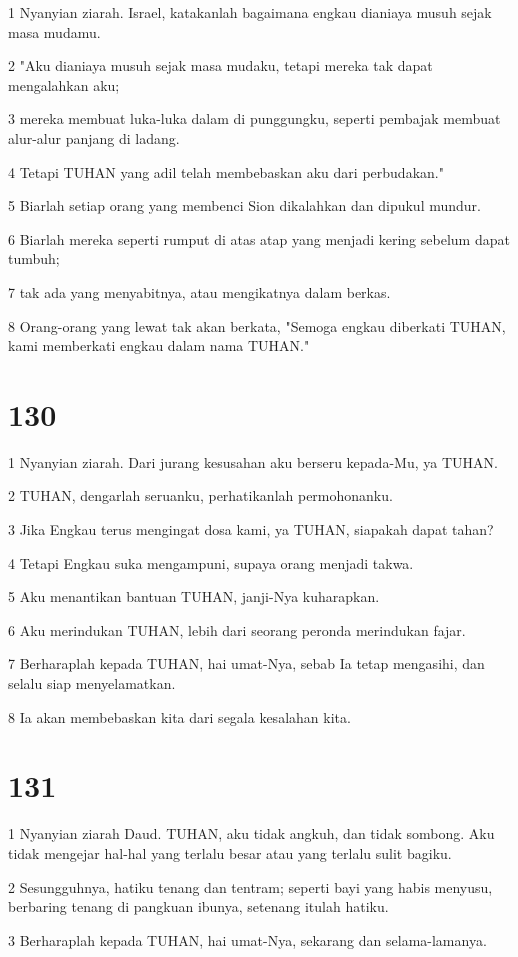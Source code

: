 \par 1 Nyanyian ziarah. Israel, katakanlah bagaimana engkau dianiaya musuh sejak masa mudamu.
\par 2 "Aku dianiaya musuh sejak masa mudaku, tetapi mereka tak dapat mengalahkan aku;
\par 3 mereka membuat luka-luka dalam di punggungku, seperti pembajak membuat alur-alur panjang di ladang.
\par 4 Tetapi TUHAN yang adil telah membebaskan aku dari perbudakan."
\par 5 Biarlah setiap orang yang membenci Sion dikalahkan dan dipukul mundur.
\par 6 Biarlah mereka seperti rumput di atas atap yang menjadi kering sebelum dapat tumbuh;
\par 7 tak ada yang menyabitnya, atau mengikatnya dalam berkas.
\par 8 Orang-orang yang lewat tak akan berkata, "Semoga engkau diberkati TUHAN, kami memberkati engkau dalam nama TUHAN."

\chapter{130}

\par 1 Nyanyian ziarah. Dari jurang kesusahan aku berseru kepada-Mu, ya TUHAN.
\par 2 TUHAN, dengarlah seruanku, perhatikanlah permohonanku.
\par 3 Jika Engkau terus mengingat dosa kami, ya TUHAN, siapakah dapat tahan?
\par 4 Tetapi Engkau suka mengampuni, supaya orang menjadi takwa.
\par 5 Aku menantikan bantuan TUHAN, janji-Nya kuharapkan.
\par 6 Aku merindukan TUHAN, lebih dari seorang peronda merindukan fajar.
\par 7 Berharaplah kepada TUHAN, hai umat-Nya, sebab Ia tetap mengasihi, dan selalu siap menyelamatkan.
\par 8 Ia akan membebaskan kita dari segala kesalahan kita.

\chapter{131}

\par 1 Nyanyian ziarah Daud. TUHAN, aku tidak angkuh, dan tidak sombong. Aku tidak mengejar hal-hal yang terlalu besar atau yang terlalu sulit bagiku.
\par 2 Sesungguhnya, hatiku tenang dan tentram; seperti bayi yang habis menyusu, berbaring tenang di pangkuan ibunya, setenang itulah hatiku.
\par 3 Berharaplah kepada TUHAN, hai umat-Nya, sekarang dan selama-lamanya.

